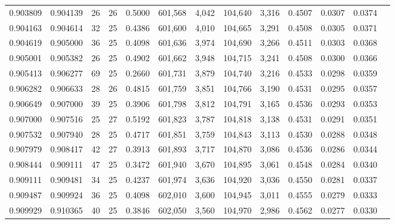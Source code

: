 \begin{tabular}{rrrrrrrrrrrrr}
0.903809 & 0.904139 &    26 &  26 &                                     0.5000 & 601,568 &   4,042 & 104,640 &   3,316 & 0.4507 & 0.0307 & 0.0374 \\
0.904163 & 0.904614 &    32 &  25 &                                     0.4386 & 601,600 &   4,010 & 104,665 &   3,291 & 0.4508 & 0.0305 & 0.0371 \\
0.904619 & 0.905000 &    36 &  25 &                                     0.4098 & 601,636 &   3,974 & 104,690 &   3,266 & 0.4511 & 0.0303 & 0.0368 \\
0.905001 & 0.905382 &    26 &  25 &                                     0.4902 & 601,662 &   3,948 & 104,715 &   3,241 & 0.4508 & 0.0300 & 0.0366 \\
0.905413 & 0.906277 &    69 &  25 &                                     0.2660 & 601,731 &   3,879 & 104,740 &   3,216 & 0.4533 & 0.0298 & 0.0359 \\
0.906282 & 0.906633 &    28 &  26 &                                     0.4815 & 601,759 &   3,851 & 104,766 &   3,190 & 0.4531 & 0.0295 & 0.0357 \\
0.906649 & 0.907000 &    39 &  25 &                                     0.3906 & 601,798 &   3,812 & 104,791 &   3,165 & 0.4536 & 0.0293 & 0.0353 \\
0.907000 & 0.907516 &    25 &  27 &                                     0.5192 & 601,823 &   3,787 & 104,818 &   3,138 & 0.4531 & 0.0291 & 0.0351 \\
0.907532 & 0.907940 &    28 &  25 &                                     0.4717 & 601,851 &   3,759 & 104,843 &   3,113 & 0.4530 & 0.0288 & 0.0348 \\
0.907979 & 0.908417 &    42 &  27 &                                     0.3913 & 601,893 &   3,717 & 104,870 &   3,086 & 0.4536 & 0.0286 & 0.0344 \\
0.908444 & 0.909111 &    47 &  25 &                                     0.3472 & 601,940 &   3,670 & 104,895 &   3,061 & 0.4548 & 0.0284 & 0.0340 \\
0.909111 & 0.909481 &    34 &  25 &                                     0.4237 & 601,974 &   3,636 & 104,920 &   3,036 & 0.4550 & 0.0281 & 0.0337 \\
0.909487 & 0.909924 &    36 &  25 &                                     0.4098 & 602,010 &   3,600 & 104,945 &   3,011 & 0.4555 & 0.0279 & 0.0333 \\
0.909929 & 0.910365 &    40 &  25 &                                     0.3846 & 602,050 &   3,560 & 104,970 &   2,986 & 0.4562 & 0.0277 & 0.0330 \\

\end{tabular}

